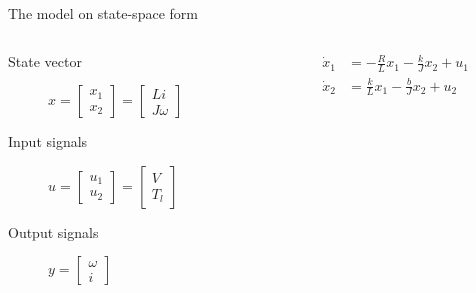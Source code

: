 \documentclass[presentation,aspectratio=169]{beamer}
\begin{document}
\begin{frame}[label={sec:orgef9b977}]{The model on state-space form}
\begin{columns}
\begin{column}{0.4\columnwidth}
\begin{description}
\item[{State vector}] \(x = \begin{bmatrix} x_1 \\x_2 \end{bmatrix} = \begin{bmatrix} Li \\J\omega \end{bmatrix}\)
\item[{Input signals}] \(u =  \begin{bmatrix} u_1 \\ u_2 \end{bmatrix} = \begin{bmatrix} V\\ T_l \end{bmatrix}\)
\item[{Output signals}] \(y =  \begin{bmatrix}\omega\\ i \end{bmatrix}\)
\end{description}
\end{column}



\begin{column}{0.6\columnwidth}
\begin{align*}
  \dot{x}_1  &= - \frac{R}{L}x_1 - \frac{k}{J}x_2 + u_1\\
  \dot{x}_2  &=  \frac{k}{L}x_1 - \frac{b}{J}x_2 + u_2
\end{align*}


\end{column}
\end{columns}
\end{frame}
\end{document}
